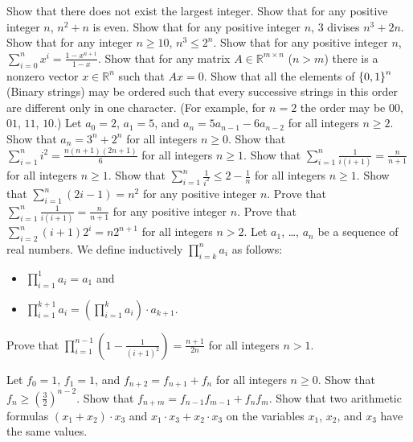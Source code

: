 \begin{chapterendexercises}
  \exercise Show that there does not exist the largest integer.
  \exercise Show that for any positive integer $n$, $n^2 + n$ is even.
  \exercise Show that for any positive integer $n$, $3$ divises
    $n^3 + 2n$.
  \exercise Show that for any integer $n \ge 10$,
    $n^3 \le 2^n$.
  \exercise Show that for any positive integer $n$,
    $\sum_{i = 0}^n x^i = \frac{1 - x^{n + 1}}{1 - x}$.
  \exercise Show that for any matrix $A \in \mathbb{R}^{m \times n}$
    ($n > m$) there is a nonzero vector $x \in \mathbb{R}^n$ such that $Ax = 0$.
  \exercise  Show that all the elements of $\set{0, 1}^n$ (Binary strings)
    may be ordered such that every successive strings in this order are
    different only in one character.
    (For example, for $n = 2$ the order may be $00$, $01$, $11$, $10$.)
  \exercise Let $a_0 = 2$, $a_1 = 5$, and $a_n = 5a_{n - 1} - 6 a_{n - 2}$
    for all integers $n \ge 2$. Show that $a_n = 3^n + 2^n$ for all integers
    $n \ge 0$.
  \exercise Show that $\sum_{i = 1}^n i^2 = \frac{n (n + 1)(2n + 1)}{6}$
    for all integers $n \ge 1$.
  \exercise Show that $\sum_{i = 1}^n \frac{1}{i (i + 1)} =
    \frac{n}{n + 1}$ for all integers $n \ge 1$.
  \exercise Show that $\sum_{i = 1}^n \frac{1}{i^2} \le
    2 - \frac{1}{n}$ for all integers $n \ge 1$.
  \exercise Show that $\sum_{i = 1}^n (2i - 1) = n^2$ for any positive
    integer $n$.
  \exercise Prove that $\sum_{i = 1}^n \frac{1}{i (i + 1)} =
    \frac{n}{n + 1}$ for any positive integer $n$.
  \exercise Prove that $\sum_{i = 2}^n (i + 1) 2^i = n 2^{n + 1}$
    for all integers $n > 2$.
  \exercise Let $a_1$, \dots, $a_n$ be a sequence of real numbers.
    We define inductively
    $\prod_{i = k}^n a_i$ as follows:
    \begin{itemize}
      \item $\prod_{i = 1}^1 a_i = a_1$ and
      \item $\prod_{i = 1}^{k + 1} a_i =
        \left( \prod_{i = 1}^k a_i \right) \cdot a_{k + 1}$.
      \end{itemize}

      Prove that $\prod_{i = 1}^{n - 1} \left(1 - \frac{1}{(i + 1)^2} \right) =
      \frac{n + 1}{2n}$ for all integers $n > 1$.

  \exercise Let $f_0 = 1$, $f_1 = 1$, and $f_{n + 2} = f_{n + 1} + f_n$ for
    all integers $n \ge 0$. Show that
    $f_n \ge \left(\frac{3}{2}\right)^{n - 2}$.
  \exercise Show that $f_{n + m} = f_{n - 1} f_{m - 1} + f_n f_m$.
  \exercise Show that two arithmetic formulas $(x_1 + x_2) \cdot x_3$ and
    $x_1 \cdot x_3 + x_2 \cdot x_3$ on the variables $x_1$, $x_2$, and $x_3$
    have the same values.


\end{chapterendexercises}
